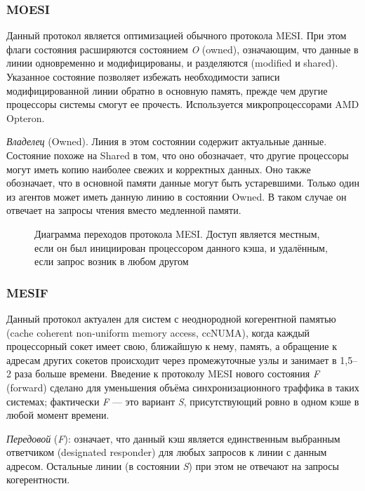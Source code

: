 \subsubsection{MOESI}

Данный протокол является оптимизацией  обычного протокола MESI. При этом флаги состояния расширяются состоянием \textit{O} (\abbr owned), означающим, что данные в линии одновременно и модифицированы, и разделяются (modified и shared). Указанное состояние позволяет избежать необходимости записи модифицированной линии обратно в основную память, прежде чем другие процессоры системы смогут ее прочесть. Используется микропроцессорами AMD Opteron.
\begin{itemize*}
\item    \textit{Владелец} (Owned). Линия в этом состоянии содержит актуальные данные. Состояние похоже на Shared в том, что оно обозначает, что другие процессоры могут иметь копию наиболее свежих и корректных данных. Оно также обозначает, что в основной памяти данные могут быть устаревшими. Только один из агентов может иметь данную линию в состоянии Owned. В таком случае он отвечает на запросы чтения вместо медленной памяти.
\end{itemize*}

\begin{figure}[htb]
    \centering
    \caption[Диаграмма переходов протокола MESI]{Диаграмма переходов протокола MESI. Доступ является местным, если он был инициирован процессором данного кэша, и удалённым, если запрос возник в любом другом}
    \label{fig:mesi}
\end{figure}

\subsubsection{MESIF}

Данный протокол актуален для систем с неоднородной когерентной памятью (\abbr cache coherent non-uniform memory access, ccNUMA), когда каждый процессорный сокет имеет свою, ближайшую к нему, память, а обращение к адресам других сокетов происходит через промежуточные узлы и занимает в 1,5--2 раза больше времени. Введение к протоколу MESI нового состояния \textit{F} (\abbr forward) сделано для уменьшения объёма синхронизационного траффика в таких системах; фактически \textit{F} — это вариант \textit{S}, присутствующий ровно в одном кэше в любой момент времени.
\begin{itemize*}
\item \textit{Передовой} (\textit{F}): означает, что данный кэш является единственным выбранным ответчиком (\abbr designated responder) для любых запросов к линии с данным адресом. Остальные линии (в состоянии \textit{S}) при этом не отвечают на запросы когерентности. 
\end{itemize*}

